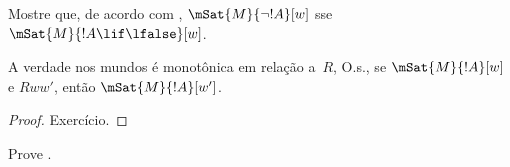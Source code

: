 \documentclass[../../../include/open-logic-section]{subfiles}
\begin{document}
\begin{prob}
  Mostre que, de acordo com ,
  $\mSat{M}{\lnot !A}[w]$ sse $\mSat{M}{!A \lif \lfalse}[w]$.
\end{prob}

\begin{prop}
  A verdade nos mundos é monotônica em relação a~$R$, O.s.\@, se
  $\mSat{M}{!A}[w]$ e $Rww'$, então $\mSat{M}{!A}[w']$.
\end{prop}

\begin{proof}
  Exercício.
\end{proof}

\begin{prob}
  Prove .
\end{prob}
\end{document}

